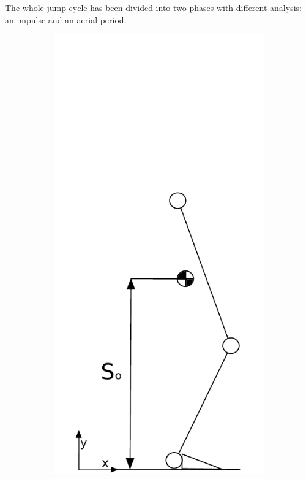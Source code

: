 The whole jump cycle has been divided into two phases with different analysis: an impulse and an aerial period.
\begin{figure}[ht!]
    \centering
    \begin{subfigure}[b]{0.3\textwidth}
        \includegraphics[width=\textwidth]{figures/launch_phase.pdf}

\end{subfigure}
\end{figure}
